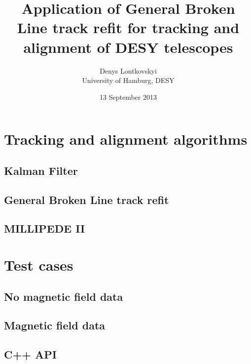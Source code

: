 \documentclass[a4paper,10pt]{article}
\title{Application of General Broken Line track refit for tracking and alignment of DESY telescopes}
\author{Denys Lontkovskyi\\University of Hamburg, DESY}
\date{13 September 2013}
\begin{document}
\maketitle



\tableofcontents



\section{Tracking and alignment algorithms}



\subsection{Kalman Filter}
\subsection{General Broken Line track refit}
\subsection{MILLIPEDE II}

\section{Test cases}
\subsection{No magnetic field data}
\subsection{Magnetic field data}

\begin{appendices}
\section{C++ API} \label{app:cppapi}
\end{appendices}
\end{document}
